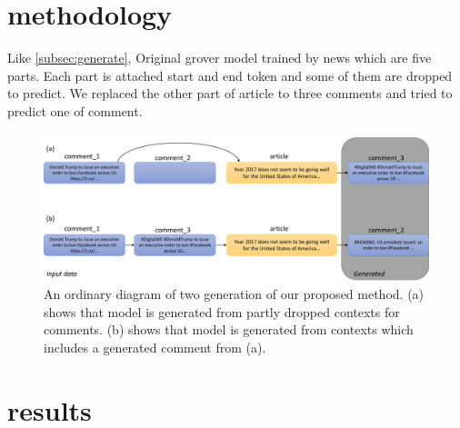 \documentclass[conference]{IEEEtran}
\begin{document}
\section{methodology}
Like \ref{subsec:generate}, Original grover model trained by news which are five parts.
Each part is attached start and end token and some of them are dropped to predict.
We replaced the other part of article to three comments and tried to predict one of comment.
\begin{figure}[!t]
    \centering
    \includegraphics[width=\linewidth,pagebox=cropbox,clip]{fig.pdf}
    \caption{
        An ordinary diagram of two generation of our proposed method.
        (a) shows that model is generated from partly dropped contexts for comments.
        (b) shows that model is generated from contexts which includes a generated comment from (a).
    }
    \label{fig:method}
\end{figure}
\section{results}
\end{document}
